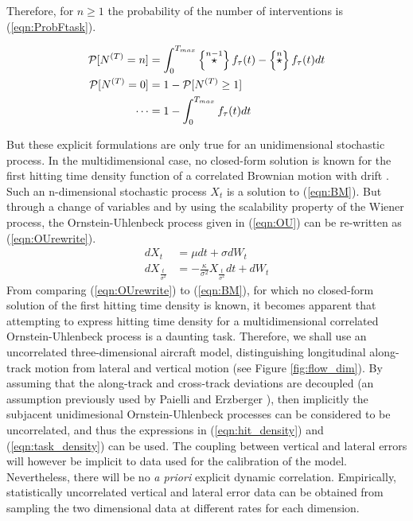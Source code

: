 \documentclass[conference]{IEEEtran}
\begin{document}
Therefore, for $n\ge1$ the probability of the number of interventions is (\ref{eqn:ProbFtask}).

\begin{align}
\mathcal P[N^{(T)}= n]&=\int_0^{T_{max}}\left\{\stackrel{n-1}{\star}\right\}f_{\tau}(t)-\left\{\stackrel{n}{\star}\right\}f_{\tau}(t)dt\label{eqn:ProbFtask}\\
\mathcal P[N^{(T)}= 0]&=1-\mathcal P[N^{(T)}\ge 1]\notag \\
\cdots &=1-\int_0^{T_{max}}f_{\tau}(t)dt \label{ProbOtask_ac}
\end{align}

But these explicit formulations are only true for an unidimensional stochastic process. In the multidimensional case, no closed-form solution is known for the first hitting time density function of a correlated Brownian motion with drift \cite{Met10}.  Such an n-dimensional stochastic process $X_t$ is a solution to (\ref{eqn:BM}). But through a change of variables and by using the scalability property of the Wiener process, the Ornstein-Uhlenbeck process given in (\ref{eqn:OU}) can be re-written as (\ref{eqn:OUrewrite}).
\begin{align}
dX_t&=\mu dt+\sigma dW_t\label{eqn:BM}\\
dX_{\frac{t}{\sigma^2}}&=-\frac{\kappa}{\sigma^2} X_{\frac{t}{\sigma^2}}dt+dW_t\label{eqn:OUrewrite}
\end{align}
From comparing (\ref{eqn:OUrewrite}) to (\ref{eqn:BM}), for which no closed-form solution of the first hitting time density is known, it becomes apparent that attempting to express hitting time density for a multidimensional correlated Ornstein-Uhlenbeck process is a daunting task. Therefore, we shall use an uncorrelated three-dimensional aircraft model, distinguishing longitudinal along-track motion from lateral and vertical motion (see Figure \ref{fig:flow_dim}). By assuming that the along-track and cross-track deviations are decoupled (an assumption previously used by Paielli and Erzberger \cite{PaielliErzberger:1997}), then implicitly the subjacent unidimesional Ornstein-Uhlenbeck processes can be considered to be uncorrelated, and thus the expressions in (\ref{eqn:hit_density}) and (\ref{eqn:task_density}) can be used. The coupling between vertical and lateral errors will however be implicit to data used for the calibration of the model. Nevertheless, there will be no \emph{a priori} explicit dynamic correlation. Empirically, statistically uncorrelated vertical and lateral error data can be obtained from sampling the two dimensional data at different rates for each dimension.
\end{document}
